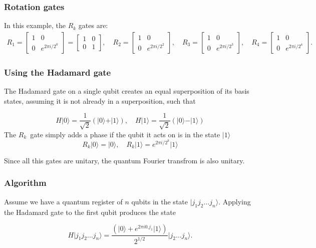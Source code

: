 \documentclass{beamer}
\begin{document}
\begin{frame}
\frametitle{Rotation gates}

In this example, the \(R_k\) gates are:
\begin{align*}
R_1 = \begin{bmatrix}
1 & 0 \\
0 & e^{2 \pi i /2^0}
\end{bmatrix} = 
\begin{bmatrix}
1 & 0 \\
0 & 1
\end{bmatrix}, \quad 
R_2 = \begin{bmatrix}
1 & 0 \\
0 & e^{2 \pi i /2^2}
\end{bmatrix}, \quad 
R_3 = \begin{bmatrix}
1 & 0 \\
0 & e^{2 \pi i /2^3}
\end{bmatrix}, \quad 
R_4 = \begin{bmatrix}
1 & 0 \\
0 & e^{2 \pi i /2^4}
\end{bmatrix}.
\end{align*}
\end{frame}

\begin{frame}
\frametitle{Using the Hadamard gate}

The Hadamard
gate on a single qubit creates an equal superposition of its basis
states, assuming it is not already in a superposition, such that

\[
H\vert 0 \rangle = \frac{1}{\sqrt{2}} \left(\vert 0 \rangle + \vert 1\rangle\right), \quad H\vert 1\rangle = \frac{1}{\sqrt{2}} \left(\vert 0 \rangle - \vert 1\rangle\right)
\]
The $R_k$ gate simply adds a phase if the qubit it acts on is in the state $\vert 1\rangle$
\[
    R_k\vert 0 \rangle = \vert 0 \rangle, \quad R_k\vert 1\rangle = e^{2\pi i/2^{k}}\vert 1\rangle
\]

Since all this gates are unitary, the quantum Fourier transfrom is also unitary.
\end{frame}

\begin{frame}
\frametitle{Algorithm}

Assume we have a quantum register of $n$ qubits in the state $\vert j_1 j_2 \dots j_n\rangle$.
Applying the Hadamard gate to the first qubit
produces the state

\[
H\vert j_1 j_2 \dots j_n\rangle = \frac{\left(\vert 0 \rangle + e^{2\pi i 0.j_1}\vert 1\rangle\right)}{2^{1/2}} \vert j_2 \dots j_n\rangle.
\]
\end{frame}
\end{document}
